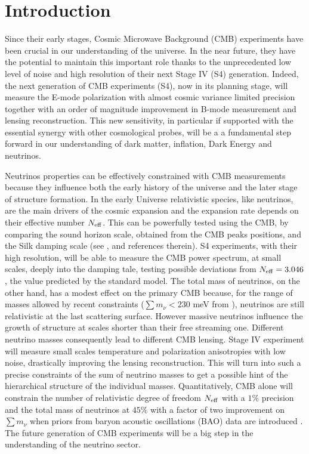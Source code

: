 \documentclass[aps,prd,reprint,superscriptaddress]{revtex4-1}
\begin{document}
\section{Introduction}\label{sec:intro}
Since their early stages, Cosmic Microwave Background (CMB) experiments have been crucial in our understanding of the universe. In the near future, they have the potential to maintain this important role  thanks to the unprecedented low level of noise and high resolution of their next Stage IV (S4) generation. 
Indeed, the next generation of CMB experiments (S4), now in its planning stage, will measure the E-mode polarization with almost cosmic variance limited precision together with an order of magnitude improvement in B-mode measurement and lensing reconstruction.
This new sensitivity, in particular if supported with the essential synergy with other cosmological probes, will be a a fundamental step forward in our understanding of dark matter, inflation, Dark Energy and neutrinos. 

Neutrinos properties can be effectively constrained with CMB measurements because they influence both the early history of the universe and the later stage of structure formation. 
In the early Universe relativistic species, like neutrinos, are the main drivers of the cosmic expansion and the expansion rate depends on their effective number $N_{\rm eff}$. This can be powerfully tested using the CMB, by comparing the sound horizon scale, obtained from the CMB peaks positions, and the Silk damping scale (see \cite{2013arXiv1309.5383A}, \cite{2013PhRvD..87h3008H} and references therein). 
S4 experiments, with their high resolution, will be able to measure the CMB power spectrum, at small scales, deeply into the damping tale, testing  possible deviations from $N_{\rm eff}=3.046$, the value predicted by the standard model.
The total mass of neutrinos, on the other hand, has a modest effect on the primary CMB because, for the range of masses allowed by recent constraints ($\sum m_\nu<230$ meV from \cite{2014A&A...571A..16P}), neutrinos are still relativistic at the last scattering surface. However massive neutrinos influence the growth of structure at scales shorter than their free streaming one. Different neutrino masses consequently lead to different CMB lensing. Stage IV experiment will measure small scales temperature and polarization anisotropies with low noise, drastically improving the lensing reconstruction. This will turn into such a precise constraints of the sum of neutrino masses to get a possible hint of the hierarchical structure of the individual masses. 
Quantitatively, CMB alone will constrain the number of relativistic degree of freedom $N_{\rm eff}$ with a $1\%$ precision and the total mass of neutrinos at $45\%$ with a factor of two improvement on $\sum m_\nu$ when priors from baryon acoustic oscillations (BAO) data are introduced \cite{wu:2014}. The future generation of CMB experiments will be a big step in the understanding of the neutrino sector.
\end{document}
